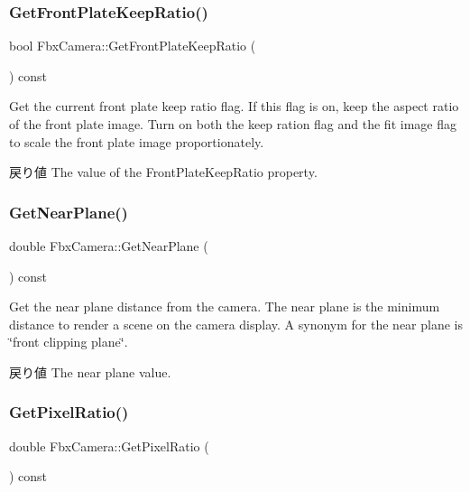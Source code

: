 \subsubsection{\texorpdfstring{Get\+Front\+Plate\+Keep\+Ratio()}{GetFrontPlateKeepRatio()}}
{\footnotesize\ttfamily bool Fbx\+Camera\+::\+Get\+Front\+Plate\+Keep\+Ratio (\begin{DoxyParamCaption}{ }\end{DoxyParamCaption}) const}

Get the current front plate keep ratio flag. If this flag is on, keep the aspect ratio of the front plate image. Turn on both the keep ration flag and the fit image flag to scale the front plate image proportionately. \begin{DoxyReturn}{戻り値}
The value of the Front\+Plate\+Keep\+Ratio property. 
\end{DoxyReturn}
\mbox{\label{class_fbx_camera_ae4c1364cd162c51ad539cf3f6fc1fbe6}} 
\subsubsection{\texorpdfstring{Get\+Near\+Plane()}{GetNearPlane()}}
{\footnotesize\ttfamily double Fbx\+Camera\+::\+Get\+Near\+Plane (\begin{DoxyParamCaption}{ }\end{DoxyParamCaption}) const}

Get the near plane distance from the camera. The near plane is the minimum distance to render a scene on the camera display. A synonym for the near plane is \char`\"{}front clipping plane\char`\"{}. \begin{DoxyReturn}{戻り値}
The near plane value. 
\end{DoxyReturn}
\mbox{\label{class_fbx_camera_ae12fca0cd15518d611dbe26f2b6babbf}} 
\subsubsection{\texorpdfstring{Get\+Pixel\+Ratio()}{GetPixelRatio()}}
{\footnotesize\ttfamily double Fbx\+Camera\+::\+Get\+Pixel\+Ratio (\begin{DoxyParamCaption}{ }\end{DoxyParamCaption}) const}

